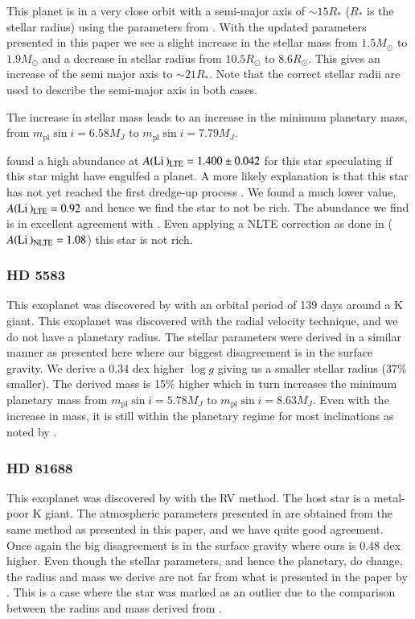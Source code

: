 \documentclass{aa}
\begin{document}
This planet is in a very close orbit with a semi-major axis of $\sim 15R_\ast$
($R_\ast$ is the stellar radius) using the parameters from \citet{Nowak2013}.
With the updated parameters presented in this paper we see a slight increase in
the stellar mass from $1.5M_\odot$ to $1.9M_\odot$ and a decrease in stellar
radius from $10.5R_\odot$ to $8.6R_\odot$. This gives an increase of the semi
major axis to $\sim 21R_\ast$. Note that the correct stellar radii are used to
describe the semi-major axis in both cases.

The increase in stellar mass leads to an increase in the minimum planetary mass,
from $m_\mathrm{pl}\sin i=6.58M_J$ to $m_\mathrm{pl}\sin i=7.79M_J$.

\citet{Nowak2013} found a high  abundance at
$A(\ion{Li}{})_\mathrm{LTE}=1.400\pm0.042$ for this star speculating if this
star might have engulfed a planet. A more likely explanation is that this star
has not yet reached the first dredge-up process \citep{Nowak2013}. We found a
much lower value, $A(\ion{Li}{})_\mathrm{LTE}=0.92$ and hence we find the star
to not be  rich. The  abundance we find is in excellent
agreement with \citet{Adamow2014}. Even applying a NLTE correction as done in
\citet{Adamow2014} ($A(\ion{Li}{})_\mathrm{NLTE}=1.08$) this star is not
 rich.


\subsubsection{HD 5583}
\label{sub:HD_5583}
This exoplanet was discovered by \citet{Niedzielski2016} with an orbital period
of 139 days around a K giant. This exoplanet was discovered with the radial
velocity technique, and we do not have a planetary radius. The stellar
parameters were derived in a similar manner as presented here \citep[see][and
references therein]{Niedzielski2016} where our biggest disagreement is in the
surface gravity. We derive a 0.34 dex higher $\log g$ giving us a smaller
stellar radius (37\% smaller). The derived mass is 15\% higher which in turn
increases the minimum planetary mass from $m_\mathrm{pl}\sin i=5.78M_J$ to
$m_\mathrm{pl}\sin i=8.63M_J$. Even with the increase in mass, it is still
within the planetary regime for most inclinations as noted by
\citet{Niedzielski2016}.



\subsubsection{HD 81688}
\label{sub:HD81688}
This exoplanet was discovered by \citet{Sato2008} with the RV method. The host
star is a metal-poor K giant. The atmospheric parameters presented in
\citet{Sato2008} are obtained from the same method as presented in this paper,
and we have quite good agreement. Once again the big disagreement is in the
surface gravity where ours is 0.48 dex higher. Even though the stellar
parameters, and hence the planetary, do change, the radius and mass we derive
are not far from what is presented in the paper by \citet{Sato2008}. This is a
case where the star was marked as an outlier due to the comparison between the
radius and mass derived from \citet{Torres2010}.
\end{document}
